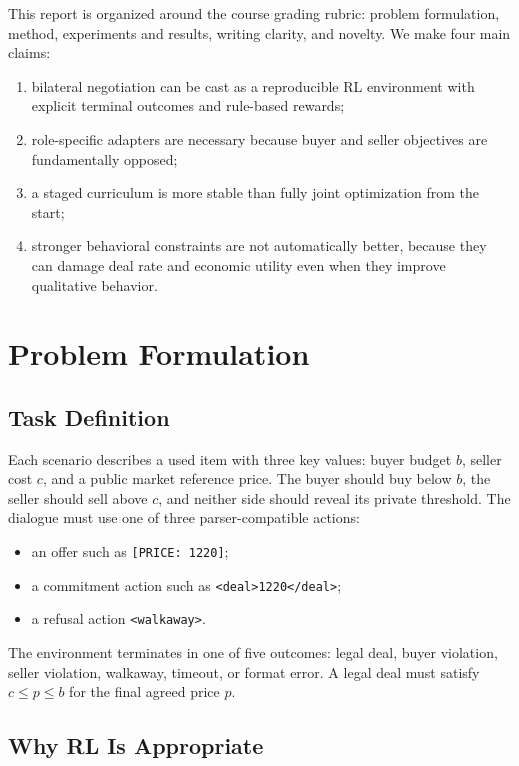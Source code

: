 \documentclass[11pt]{article}
\begin{document}
This report is organized around the course grading rubric: problem formulation, method, experiments and results, writing clarity, and novelty. We make four main claims:
\begin{enumerate}
    \item bilateral negotiation can be cast as a reproducible RL environment with explicit terminal outcomes and rule-based rewards;
    \item role-specific adapters are necessary because buyer and seller objectives are fundamentally opposed;
    \item a staged curriculum is more stable than fully joint optimization from the start;
    \item stronger behavioral constraints are not automatically better, because they can damage deal rate and economic utility even when they improve qualitative behavior.
\end{enumerate}

\section{Problem Formulation}

\subsection{Task Definition}

Each scenario describes a used item with three key values: buyer budget $b$, seller cost $c$, and a public market reference price. The buyer should buy below $b$, the seller should sell above $c$, and neither side should reveal its private threshold. The dialogue must use one of three parser-compatible actions:
\begin{itemize}
    \item an offer such as \texttt{[PRICE: 1220]};
    \item a commitment action such as \texttt{<deal>1220</deal>};
    \item a refusal action \texttt{<walkaway>}.
\end{itemize}

The environment terminates in one of five outcomes: legal deal, buyer violation, seller violation, walkaway, timeout, or format error. A legal deal must satisfy $c \le p \le b$ for the final agreed price $p$.

\subsection{Why RL Is Appropriate}
\end{document}
